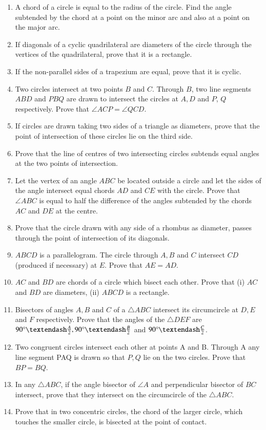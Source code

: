 \begin{enumerate}[label=\thesubsection.\arabic*.,ref=\thesubsection.\theenumi]
\fi
\item A chord of a circle is equal to the radius of the
circle. Find the angle subtended by the chord at
a point on the minor arc and also at a point on the
major arc.
\item If diagonals of a cyclic quadrilateral are diameters of the circle through the vertices of
the quadrilateral, prove that it is a rectangle.
\item If the non-parallel sides of a trapezium are equal, prove that it is cyclic.
	\iffalse
\begin{enumerate}


\end{enumerate}
\fi

\item Two circles intersect at two points $B$ and $C$.
Through $B$, two line segments $ABD$ and $PBQ$
are drawn to intersect the circles at $A, D$ and $P$,
$Q$ respectively. Prove that
$\angle ACP = \angle QCD$.
\item If circles are drawn taking two sides of a triangle as diameters, prove that the point of
intersection of these circles lie on the third side.
\item Prove that the line of centres of two intersecting circles subtends equal angles at the
two points of intersection.
\item Let the vertex of an angle $ABC$ be located outside a circle and let the sides of the angle
intersect equal chords $AD$ and $CE$ with the circle. Prove that $\angle ABC$ is equal to half the
difference of the angles subtended by the chords $AC$ and $DE$ at the centre.
\item Prove that the circle drawn with any side of a rhombus as diameter, passes through
the point of intersection of its diagonals.
\item $ABCD$ is a parallelogram. The circle through $A, B$ and $C$ intersect $CD$ (produced if
necessary) at $E$. Prove that $AE = AD$.
\item $AC$ and $BD$ are chords of a circle which bisect each other. Prove that (i) $AC$ and $BD$ are
diameters, (ii) $ABCD$ is a rectangle.
\item Bisectors of angles $A, B$ and $C$ of a $\triangle ABC$ intersect its circumcircle at $D, E$ and
$F$ respectively. Prove that the angles of the $\triangle DEF$ are $90\degree – \frac{A}{2}, 90\degree – \frac{B}{2}$ and $90\degree – \frac{C}{2}$.
\item Two congruent circles intersect each other at points A and B. Through A any line segment PAQ is drawn so that $P, Q$ lie on the two circles. Prove that $BP = BQ$.
\item In any $\triangle ABC$, if the angle bisector of $\angle A$ and perpendicular bisector of $BC$ intersect, prove that they intersect on the circumcircle of the $\triangle ABC$.
%
%
\item Prove that in two concentric circles, the chord of the larger circle, which touches the smaller circle, is bisected at the point of contact.
%
%
%
\end{enumerate}
